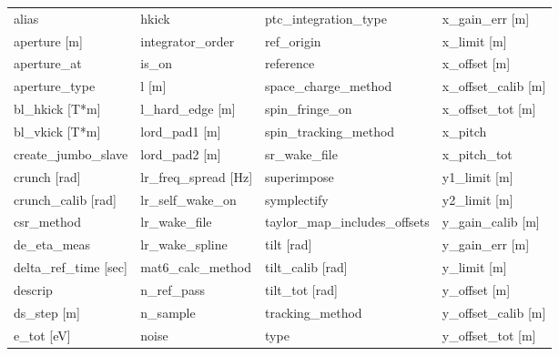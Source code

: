  \begin{tabular}{llll} \toprule
alias                          & hkick                          & ptc_integration_type           & x_gain_err [m]                 \\
aperture [m]                   & integrator_order               & ref_origin                     & x_limit [m]                    \\
aperture_at                    & is_on                          & reference                      & x_offset [m]                   \\
aperture_type                  & l [m]                          & space_charge_method            & x_offset_calib [m]             \\
bl_hkick [T*m]                 & l_hard_edge [m]                & spin_fringe_on                 & x_offset_tot [m]               \\
bl_vkick [T*m]                 & lord_pad1 [m]                  & spin_tracking_method           & x_pitch                        \\
create_jumbo_slave             & lord_pad2 [m]                  & sr_wake_file                   & x_pitch_tot                    \\
crunch [rad]                   & lr_freq_spread [Hz]            & superimpose                    & y1_limit [m]                   \\
crunch_calib [rad]             & lr_self_wake_on                & symplectify                    & y2_limit [m]                   \\
csr_method                     & lr_wake_file                   & taylor_map_includes_offsets    & y_gain_calib [m]               \\
de_eta_meas                    & lr_wake_spline                 & tilt [rad]                     & y_gain_err [m]                 \\
delta_ref_time [sec]           & mat6_calc_method               & tilt_calib [rad]               & y_limit [m]                    \\
descrip                        & n_ref_pass                     & tilt_tot [rad]                 & y_offset [m]                   \\
ds_step [m]                    & n_sample                       & tracking_method                & y_offset_calib [m]             \\
e_tot [eV]                     & noise                          & type                           & y_offset_tot [m]               \\

\end{tabular}
